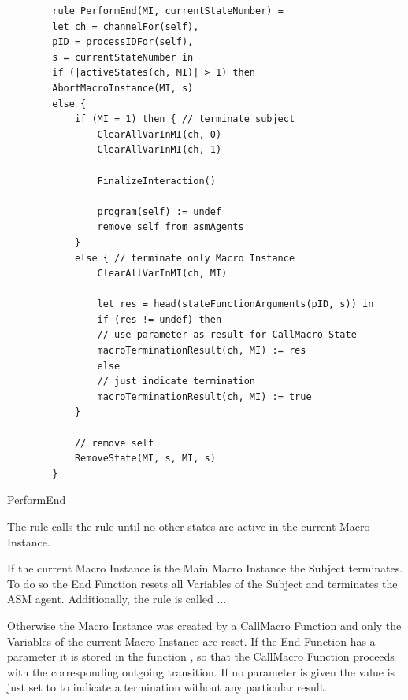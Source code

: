 \begin{listing}[H]
	\begin{verbatim}
		rule PerformEnd(MI, currentStateNumber) =
		let ch = channelFor(self),
		pID = processIDFor(self),
		s = currentStateNumber in
		if (|activeStates(ch, MI)| > 1) then
		AbortMacroInstance(MI, s)
		else {
			if (MI = 1) then { // terminate subject
				ClearAllVarInMI(ch, 0)
				ClearAllVarInMI(ch, 1)
				
				FinalizeInteraction()
				
				program(self) := undef
				remove self from asmAgents
			}
			else { // terminate only Macro Instance
				ClearAllVarInMI(ch, MI)
				
				let res = head(stateFunctionArguments(pID, s)) in
				if (res != undef) then
				// use parameter as result for CallMacro State
				macroTerminationResult(ch, MI) := res
				else
				// just indicate termination
				macroTerminationResult(ch, MI) := true
			}
			
			// remove self
			RemoveState(MI, s, MI, s)
		}
	\end{verbatim}
	\caption{PerformEnd}
	\label{lst:shortasm:PerformEnd}
\end{listing}

The  rule calls the  rule
until no other states are active in the current Macro Instance.

If the current Macro Instance is the Main Macro Instance the Subject terminates.
To do so the End Function resets all Variables of the Subject and terminates the
ASM agent.
Additionally, the  rule is called ... %

Otherwise the Macro Instance was created by a CallMacro Function and only the
Variables of the current Macro Instance are reset. If the End Function has a
parameter it is stored in the function , so
that the CallMacro Function proceeds with the corresponding outgoing transition.
If no parameter is given the value is just set to  to indicate a
termination without any particular result.

